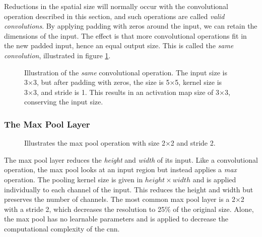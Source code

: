     Reductions in the spatial size will normally occur with the convolutional operation described in this section, and such operations are called \textit{valid convolutions}\cite{o2015introduction_convolutions}. By applying padding with zeros around the input, we can retain the dimensions of the input. The effect is that more convolutional operations fit in the new padded input, hence an equal output size. This is called the \textit{same convolution}, illustrated in figure \ref{same_convolutional_fig}.
    
    \begin{figure}[H]
        \centering
        
        \caption[Same convolution example]{Illustration of the \textit{same} convolutional operation. The input size is 3×3, but after padding with zeros, the size is 5×5, kernel size is 3×3, and stride is 1. This results in an activation map size of 3×3, conserving the input size.}
      	\medskip 
        \label{same_convolutional_fig}
    \end{figure}
    
    
    
\subsubsection{The Max Pool Layer}

    \begin{figure}[H]
        \centering
                
        \caption[The max pool operation]{Illustrates the max pool operation with size 2×2 and stride 2.}
      	\medskip 
        \label{maxpool_fig}
    \end{figure}
    The max pool layer reduces the \textit{height} and \textit{width} of its input\cite{o2015introduction_convolutions}. Like a convolutional operation, the max pool looks at an input region but instead applies a \textit{max} operation. The pooling kernel size is given in $height \times width$ and is applied individually to each channel of the input. This reduces the height and width but preserves the number of channels. The most common max pool layer is a 2×2 with a stride 2, which decreases the resolution to 25\% of the original size. Alone, the max pool has no learnable parameters and is applied to decrease the computational complexity of the \gls{cnn}.


